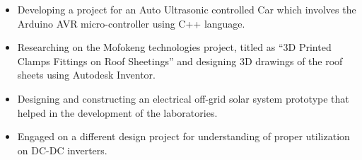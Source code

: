 \documentclass[10pt,a4paper,ragged2e]{altacv}
\begin{document}
\begin{itemize}

\item Developing a project for an Auto Ultrasonic controlled Car which involves the Arduino AVR micro-controller using C++ language.
\item Researching on the Mofokeng technologies project, titled as ``3D Printed Clamps Fittings on Roof Sheetings'' and designing 3D drawings of the roof sheets using Autodesk Inventor.

\end{itemize}


\divider



\begin{itemize}
\item Designing and constructing an electrical off-grid solar system prototype that helped in the development of the laboratories.
\item Engaged on a different design project for understanding of proper utilization on DC-DC inverters.
\end{itemize}


\end{document}
